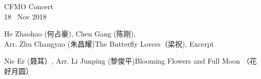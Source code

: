 \documentclass[letter,6pt,poets]{ConcProg}
\begin{document}
\begin{programme}{
    CFMO Concert
\\  {\normalsize 18 ~Nov 2018}
}
  \begin{part}[]
    \begin{composition}{He Zhaohao (何占豪), Chen Gang (陈刚), \\Arr. Zhu Changyao (朱昌耀)}{}{The Butterfly Lovers（梁祝), Excerpt}{}
    \end{composition}
    
    \begin{composition}{Nie Er (聂耳）, Arr. Li Junping (黎俊平)}{}{Blooming Flowers and Full Moon （花好月圆）}{}      
    \end{composition}
    

\end{part}
\end{programme}
\end{document}
